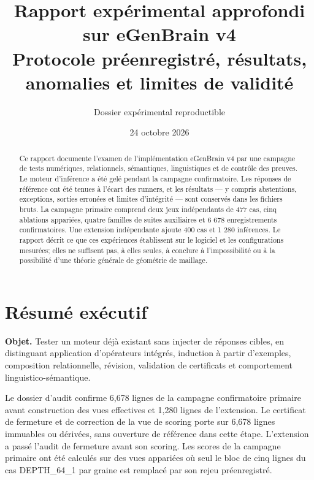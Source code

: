 \documentclass[11pt,a4paper]{article}
\title{Rapport expérimental approfondi sur eGenBrain v4\\\large Protocole préenregistré, résultats, anomalies et limites de validité}
\author{Dossier expérimental reproductible}
\date{24 octobre 2026}
\begin{document}
\maketitle
\begin{abstract}
Ce rapport documente l’examen de l’implémentation eGenBrain v4 par une campagne de tests numériques, relationnels, sémantiques, linguistiques et de contrôle des preuves. Le moteur d’inférence a été gelé pendant la campagne confirmatoire. Les réponses de référence ont été tenues à l’écart des runners, et les résultats — y compris abstentions, exceptions, sorties erronées et limites d’intégrité — sont conservés dans les fichiers bruts. La campagne primaire comprend deux jeux indépendants de 477 cas, cinq ablations appariées, quatre familles de suites auxiliaires et 6 678 enregistrements confirmatoires. Une extension indépendante ajoute 400 cas et 1 280 inférences. Le rapport décrit ce que ces expériences établissent sur le logiciel et les configurations mesurées; elles ne suffisent pas, à elles seules, à conclure à l’impossibilité ou à la possibilité d’une théorie générale de géométrie de maillage.
\end{abstract}
\tableofcontents
\newpage

\section{Résumé exécutif}
\textbf{Objet.} Tester un moteur déjà existant sans injecter de réponses cibles, en distinguant application d’opérateurs intégrés, induction à partir d’exemples, composition relationnelle, révision, validation de certificats et comportement linguistico-sémantique.

Le dossier d’audit confirme 6,678 lignes de la campagne confirmatoire primaire avant construction des vues effectives et 1,280 lignes de l’extension. Le certificat de fermeture et de correction de la vue de scoring porte sur 6,678 lignes immuables ou dérivées, sans ouverture de référence dans cette étape. L’extension a passé l’audit de fermeture avant son scoring. Les scores de la campagne primaire ont été calculés sur des vues appariées où seul le bloc de cinq lignes du cas DEPTH\_64\_1 par graine est remplacé par son rejeu préenregistré.
\end{document}
